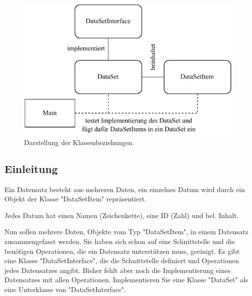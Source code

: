 \documentclass[
    oneside, %
    12pt, %
    a4paper, %
    parskip=full %
]{scrartcl}
\begin{document}
\begin{figure}
    \centering
    \includegraphics{./../diagram/classes_files.pdf}
    \caption{Darstellung der Klassenbeziehungen.}
\end{figure}

\subsection{Einleitung}

Ein Datensatz besteht aus mehreren Daten, ein einzelnes Datum wird durch ein Objekt der Klasse "DataSetItem" repräsentiert.

Jedes Datum hat einen Namen (Zeichenkette), eine ID (Zahl) und bel. Inhalt.


Nun sollen mehrere Daten, Objekte vom Typ "DataSetItem", in einem Datensatz zusammengefasst werden.
Sie haben sich schon auf eine Schnittstelle und die benötigen Operationen, die ein Datensatz unterstützen muss, geeinigt.
Es gibt eine Klasse "DataSetInterface", die die Schnittstelle definiert und Operationen jedes Datensatzes angibt.
Bisher fehlt aber noch die Implementierung eines Datensatzes mit allen Operationen.
Implementieren Sie eine Klasse "DataSet" als eine Unterklasse von "DataSetInterface".
\end{document}
